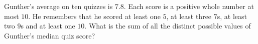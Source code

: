 Gunther's average on ten quizzes is $7.8$. Each score is a positive whole number at most $10$. He remembers that he scored at least one $5$, at least three $7$s, at least two $9$s and at least one $10$. What is the sum of all the distinct possible values of Gunther's median quiz score?
